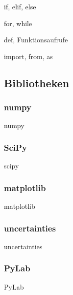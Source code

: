     \begin{frame}{if, elif, else}
    \end{frame}

    \begin{frame}{for, while}
    \end{frame}

    \begin{frame}{def, Funktionsaufrufe}
    \end{frame}

    \begin{frame}{import, from, as}
    \end{frame}

  \subsection{Bibliotheken}
    \subsubsection{numpy}
      \begin{frame}{numpy}
      \end{frame}

    \subsubsection{SciPy}
      \begin{frame}{scipy}
      \end{frame}

    \subsubsection{matplotlib}
      \begin{frame}{matplotlib}
      \end{frame}

    \subsubsection{uncertainties}
      \begin{frame}{uncertainties}
      \end{frame}

    \subsubsection{PyLab}
      \begin{frame}{PyLab}
      \end{frame}
